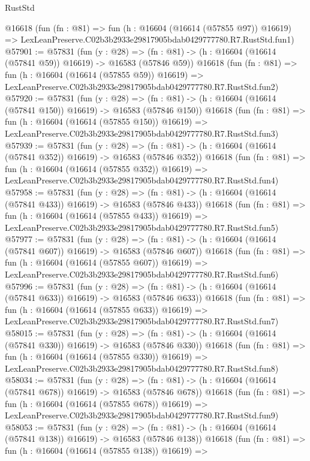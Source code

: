 \begin{lexlean}{RustStd}
\begin{coremodule}
    @16618
    (fun (fn : @81) =>
    fun (h : @16604 (@16614 (@57855 @97)) @16619) =>
    LexLeanPreserve.C02b3b2933e29817905bdab0429777780.R7.RustStd.fun1)
@57901 := @57831
    (fun (y : @28) =>
    (fn : @81) -> (h : @16604 (@16614 (@57841 @59)) @16619) -> @16583 (@57846 @59))
    @16618
    (fun (fn : @81) =>
    fun (h : @16604 (@16614 (@57855 @59)) @16619) =>
    LexLeanPreserve.C02b3b2933e29817905bdab0429777780.R7.RustStd.fun2)
@57920 := @57831
    (fun (y : @28) =>
    (fn : @81) -> (h : @16604 (@16614 (@57841 @150)) @16619) -> @16583 (@57846 @150))
    @16618
    (fun (fn : @81) =>
    fun (h : @16604 (@16614 (@57855 @150)) @16619) =>
    LexLeanPreserve.C02b3b2933e29817905bdab0429777780.R7.RustStd.fun3)
@57939 := @57831
    (fun (y : @28) =>
    (fn : @81) -> (h : @16604 (@16614 (@57841 @352)) @16619) -> @16583 (@57846 @352))
    @16618
    (fun (fn : @81) =>
    fun (h : @16604 (@16614 (@57855 @352)) @16619) =>
    LexLeanPreserve.C02b3b2933e29817905bdab0429777780.R7.RustStd.fun4)
@57958 := @57831
    (fun (y : @28) =>
    (fn : @81) -> (h : @16604 (@16614 (@57841 @433)) @16619) -> @16583 (@57846 @433))
    @16618
    (fun (fn : @81) =>
    fun (h : @16604 (@16614 (@57855 @433)) @16619) =>
    LexLeanPreserve.C02b3b2933e29817905bdab0429777780.R7.RustStd.fun5)
@57977 := @57831
    (fun (y : @28) =>
    (fn : @81) -> (h : @16604 (@16614 (@57841 @607)) @16619) -> @16583 (@57846 @607))
    @16618
    (fun (fn : @81) =>
    fun (h : @16604 (@16614 (@57855 @607)) @16619) =>
    LexLeanPreserve.C02b3b2933e29817905bdab0429777780.R7.RustStd.fun6)
@57996 := @57831
    (fun (y : @28) =>
    (fn : @81) -> (h : @16604 (@16614 (@57841 @633)) @16619) -> @16583 (@57846 @633))
    @16618
    (fun (fn : @81) =>
    fun (h : @16604 (@16614 (@57855 @633)) @16619) =>
    LexLeanPreserve.C02b3b2933e29817905bdab0429777780.R7.RustStd.fun7)
@58015 := @57831
    (fun (y : @28) =>
    (fn : @81) -> (h : @16604 (@16614 (@57841 @330)) @16619) -> @16583 (@57846 @330))
    @16618
    (fun (fn : @81) =>
    fun (h : @16604 (@16614 (@57855 @330)) @16619) =>
    LexLeanPreserve.C02b3b2933e29817905bdab0429777780.R7.RustStd.fun8)
@58034 := @57831
    (fun (y : @28) =>
    (fn : @81) -> (h : @16604 (@16614 (@57841 @678)) @16619) -> @16583 (@57846 @678))
    @16618
    (fun (fn : @81) =>
    fun (h : @16604 (@16614 (@57855 @678)) @16619) =>
    LexLeanPreserve.C02b3b2933e29817905bdab0429777780.R7.RustStd.fun9)
@58053 := @57831
    (fun (y : @28) =>
    (fn : @81) -> (h : @16604 (@16614 (@57841 @138)) @16619) -> @16583 (@57846 @138))
    @16618
    (fun (fn : @81) =>
    fun (h : @16604 (@16614 (@57855 @138)) @16619) =>

\end{coremodule}
\end{lexlean}

